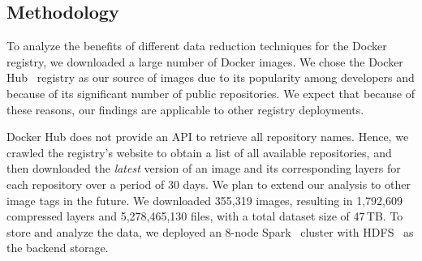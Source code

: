 \subsection{Methodology}
\label{sec:methodology}

%

To analyze the benefits of different data reduction techniques for the Docker registry,
we downloaded a large number of Docker images.
%
We chose the Docker Hub~\cite{docker-hub} registry as our source of images
due to its popularity among developers and because of its significant number
of public repositories.
%
We expect that because of these reasons, our findings are applicable to other
registry deployments.

Docker Hub does not provide an API to retrieve all repository names.
Hence, we crawled the registry's website to obtain a list of all available
repositories, and then downloaded the \emph{latest} version of an image and its
corresponding layers for each repository over a period of 30 days.
%
We plan to extend our analysis to other image tags in the future.
%
We downloaded 355,319 images, resulting in 1,792,609 compressed layers
and 5,278,465,130 files, with a total dataset size of 47\,TB.
%
%
To store and analyze the data, we deployed an 8-node Spark~\cite{spark}
cluster with HDFS~\cite{hdfs} as the backend storage.

